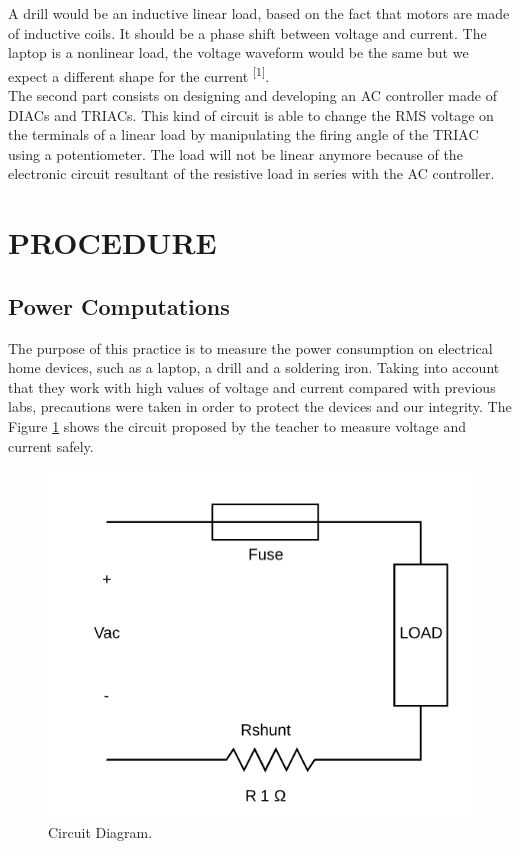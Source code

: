 \documentclass[journal]{IEEEtran}
\begin{document}
A drill would be an inductive linear load, based on the fact that 
motors are made of inductive coils. It should be a phase shift between 
voltage and current. The laptop is a nonlinear load, the voltage 
waveform would be the same but we expect a different shape for the 
current \textsuperscript{[1]}. \\

The second part consists on designing and developing an AC controller 
made of DIACs and TRIACs. This kind of circuit is able to change the 
RMS voltage on the terminals of a linear load by manipulating the 
firing angle of the TRIAC using a potentiometer. The load will not be 
linear anymore because of the electronic circuit resultant of the 
resistive load in series with the AC controller.\\


\section{PROCEDURE}

\subsection{Power Computations}

The purpose of this practice is to measure the power consumption on 
electrical home devices, such as a laptop, a drill and a soldering 
iron. Taking into account that they work with high values of voltage 
and current compared with previous labs, precautions were taken in 
order to protect the devices and our integrity. The Figure
\ref{circuit_diagram} 
shows the circuit proposed by the teacher to measure voltage and 
current safely. 

\begin{figure}[h]
\centering
\includegraphics[clip,width=0.8\columnwidth]{circuit_diagram.png}
\caption{Circuit Diagram.}
\label{circuit_diagram}
\end{figure}
\end{document}

